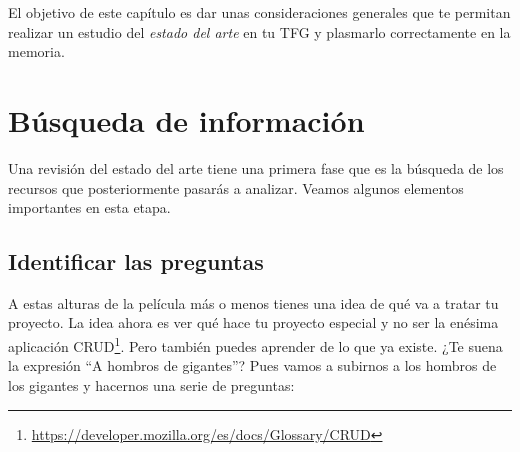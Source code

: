 El objetivo de este capítulo es dar unas consideraciones generales que te permitan realizar un estudio del {\it estado del arte} en tu TFG y plasmarlo correctamente en la memoria. 

\section{Búsqueda de información}

Una revisión del estado del arte tiene una primera fase que es la búsqueda de los recursos que posteriormente pasarás a analizar. Veamos algunos elementos importantes en esta etapa.

\subsection{Identificar las preguntas}


A estas alturas de la película más o menos tienes una idea de qué va a tratar tu proyecto. La idea ahora es ver qué hace tu proyecto especial y no ser la enésima aplicación CRUD\footnote{\url{https://developer.mozilla.org/es/docs/Glossary/CRUD}}. Pero también puedes aprender de lo que ya existe. ¿Te suena la expresión ``A hombros de gigantes''? Pues vamos a subirnos a los hombros de los gigantes y hacernos una serie de preguntas:

